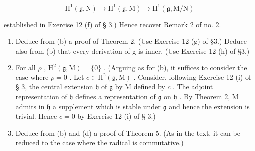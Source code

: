 \[
\mathrm{H} ^ {1} (\mathfrak {g}, \mathrm{N}) \rightarrow \mathrm{H} ^ {1} (\mathfrak {g}, \mathrm{M}) \rightarrow \mathrm{H} ^ {1} (\mathfrak {g}, \mathrm{M} / \mathrm{N})
\]

established in Exercise 12 (f) of § 3.) Hence recover Remark 2 of no. 2.

\begin{enumerate}
\def\labelenumi{(\alph{enumi})}
\setcounter{enumi}{2}
\item
  Deduce from (b) a proof of Theorem 2. (Use Exercise 12 (g) of §3.) Deduce also from (b) that every derivation of g is inner. (Use Exercise 12 (h) of §3.)
\item
  For all \(\rho\) , \(\mathrm{H}^2(\mathfrak{g}, \mathrm{M}) = \{0\}\) . (Arguing as for (b), it suffices to consider the case where \(\rho = 0\) . Let \(c \in \mathrm{H}^2(\mathfrak{g}, \mathrm{M})\) . Consider, following Exercise 12 (i) of § 3, the central extension \(\mathfrak{h}\) of \(\mathfrak{g}\) by \(\mathrm{M}\) defined by \(c\) . The adjoint representation of \(\mathfrak{h}\) defines a representation of \(\mathfrak{g}\) on \(\mathfrak{h}\) . By Theorem 2, \(\mathrm{M}\) admits in \(\mathfrak{h}\) a supplement which is stable under \(\mathfrak{g}\) and hence the extension is trivial. Hence \(c = 0\) by Exercise 12 (i) of § 3.)
\item
  Deduce from (b) and (d) a proof of Theorem 5. (As in the text, it can be reduced to the case where the radical is commutative.)
\end{enumerate}

